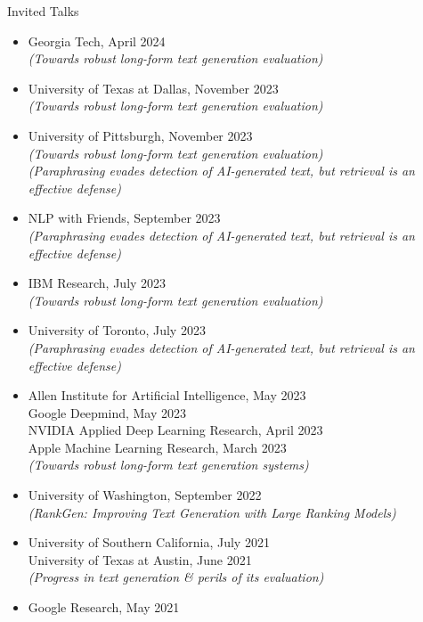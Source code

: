 \documentclass{resume} %
\begin{document}
\begin{rSection}{Invited Talks}
\vspace*{0.1in}
\begin{itemize}[leftmargin=*]
\item Georgia Tech, April 2024 \\
\textit{(Towards robust long-form text generation evaluation)}

\item University of Texas at Dallas, November 2023 \\
\textit{(Towards robust long-form text generation evaluation)}
\item University of Pittsburgh, November 2023 \\
\textit{(Towards robust long-form text generation evaluation)} \\
\textit{(Paraphrasing evades detection of AI-generated text, but retrieval is an effective defense)}
\item NLP with Friends, September 2023 \\
\textit{(Paraphrasing evades detection of AI-generated text, but retrieval is an effective defense)}
\item IBM Research, July 2023 \\ \textit{(Towards robust long-form text generation evaluation)}
\item University of Toronto, July 2023 \\ \textit{(Paraphrasing evades detection of AI-generated text, but retrieval is an effective defense)}
\item Allen Institute for Artificial Intelligence, May 2023 \\ Google Deepmind, May 2023 \\ NVIDIA Applied Deep Learning Research, April 2023 \\ Apple Machine Learning Research, March 2023 \\ \textit{(Towards robust long-form text generation systems)}
\item University of Washington, September 2022 \\
\textit{(RankGen: Improving Text Generation with Large Ranking Models)}
\item University of Southern California, July 2021 \\
University of Texas at Austin, June 2021 \\
\textit{(Progress in text generation \& perils of its evaluation)}
\item Google Research, May 2021\\

\end{itemize}
\end{rSection}
\end{document}
